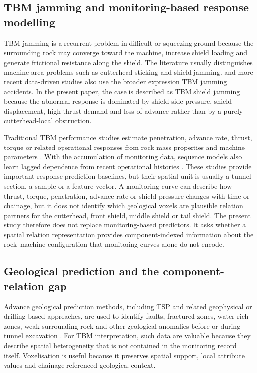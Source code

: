 \subsection{TBM jamming and monitoring-based response modelling}
TBM jamming is a recurrent problem in difficult or squeezing ground because the surrounding rock may converge toward the machine, increase shield loading and generate frictional resistance along the shield. The literature usually distinguishes machine-area problems such as cutterhead sticking and shield jamming, and more recent data-driven studies also use the broader expression TBM jamming accidents. In the present paper, the case is described as TBM shield jamming because the abnormal response is dominated by shield-side pressure, shield displacement, high thrust demand and loss of advance rather than by a purely cutterhead-local obstruction.

Traditional TBM performance studies estimate penetration, advance rate, thrust, torque or related operational responses from rock mass properties and machine parameters \citep{yagiz2008utilizing,hassanpour2010tbm,armaghani2018prediction}. With the accumulation of monitoring data, sequence models also learn lagged dependence from recent operational histories \citep{hochreiter1997long,cho2014learning}. These studies provide important response-prediction baselines, but their spatial unit is usually a tunnel section, a sample or a feature vector. A monitoring curve can describe how thrust, torque, penetration, advance rate or shield pressure changes with time or chainage, but it does not identify which geological voxels are plausible relation partners for the cutterhead, front shield, middle shield or tail shield. The present study therefore does not replace monitoring-based predictors. It asks whether a spatial relation representation provides component-indexed information about the rock--machine configuration that monitoring curves alone do not encode.

\subsection{Geological prediction and the component-relation gap}
Advance geological prediction methods, including TSP and related geophysical or drilling-based approaches, are used to identify faults, fractured zones, water-rich zones, weak surrounding rock and other geological anomalies before or during tunnel excavation \citep{li2019tunnel}. For TBM interpretation, such data are valuable because they describe spatial heterogeneity that is not contained in the monitoring record itself. Voxelisation is useful because it preserves spatial support, local attribute values and chainage-referenced geological context.

